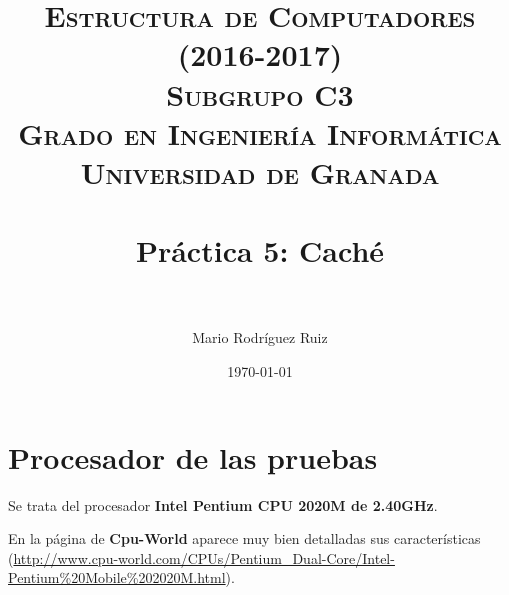 


\title{	
\normalfont \normalsize 
\textsc{\textbf{Estructura de Computadores (2016-2017)} \\ Subgrupo C3 \\ Grado en Ingeniería Informática\\ Universidad de Granada} \\ [25pt] %
\horrule{0.5pt} \\[0.4cm] %
\huge Práctica 5: Caché \\ %
\horrule{2pt} \\[0.5cm] %
}

\author{Mario Rodríguez Ruiz} %

\date{\normalsize\today} %




\maketitle %

\newpage %

\tableofcontents %

\listoffigures

\newpage


\section{Procesador de las pruebas}

Se trata del procesador \textbf{Intel Pentium CPU 2020M de 2.40GHz}. 	

En la página de \textbf{Cpu-World} aparece muy bien detalladas sus características (\url{http://www.cpu-world.com/CPUs/Pentium_Dual-Core/Intel-Pentium%20Mobile%202020M.html}).
\\

